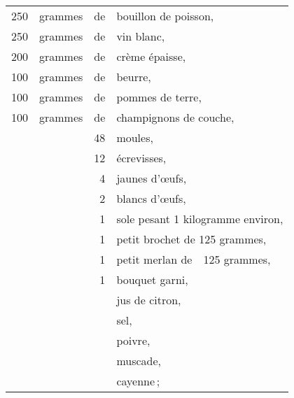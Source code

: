 \footnotesize
\begin{longtable}{rrrp{16em}}
    250 & grammes & de & bouillon de poisson,                                                             \\
    250 & grammes & de & vin blanc,                                                                       \\
    200 & grammes & de & crème épaisse,                                                                   \\
    100 & grammes & de & beurre,                                                                          \\
    100 & grammes & de & pommes de terre,                                                                 \\
    100 & grammes & de & champignons de couche,                                                           \\
        &         & 48 & moules,                                                                          \\
        &         & 12 & écrevisses,                                                                      \\
        &         &  4 & jaunes d'œufs,                                                                   \\
        &         &  2 & blancs d'œufs,                                                                   \\
        &         &  1 & sole pesant 1 kilogramme environ,                                                \\
        &         &  1 & petit brochet de 125 grammes,                                                    \\
        &         &  1 & petit merlan de  125 grammes,                                                    \\
        &         &  1 & bouquet garni,                                                                   \\
        &         &    & jus de citron,                                                                   \\
        &         &    & sel,                                                                             \\
        &         &    & poivre,                                                                          \\
        &         &    & muscade,                                                                         \\
        &         &    & cayenne ;                                                                        \\
\end{longtable}
\normalsize

